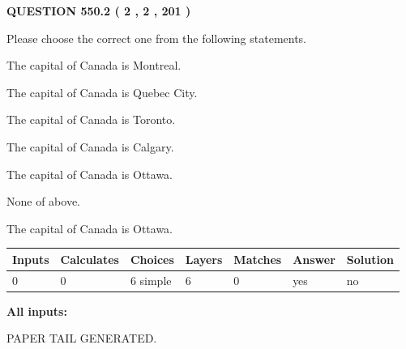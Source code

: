 \documentclass[12pt]{article}
\begin{document}
\vspace{0.2in}
  
{\textbf{\Large{QUESTION
550.2 
 ( 2 , 2 , 201 )
}}}
  
  
Please choose the correct one from the following statements.
 
 
The capital of Canada is Montreal.
 
 
The capital of Canada is Quebec City.
 
 
The capital of Canada is Toronto.
 
 
The capital of Canada is Calgary.
 
 
The capital of Canada is Ottawa.
 
 
 None of above.
 
 
\noindent{}
 
 
The capital of Canada is Ottawa.
 
 
\noindent{}
 
 
   
   
   
   
\noindent\begin{tabular}{|l|l|l|l|l|l|l|}
 \hline
Inputs & Calculates & Choices & Layers & Matches & Answer & Solution \\ \hline
 0  & 
 0  & 
 6
  simple  
  & 
 6  & 
 0  & 
  yes & 
  no 
  \\ \hline
 \end{tabular}
   
   
   
   
\noindent{}
   
   
   
   
\noindent\vspace{0.1in}\hspace{-0.08in} {\textbf{\Large{All inputs: }}}
   
   
   
   
   
   
 \vspace{0.2in}
 
   
   
\vspace{2.0in} PAPER TAIL GENERATED.
   
\end{document}
